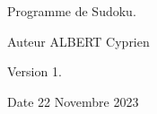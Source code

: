 Programme de Sudoku.

\begin{DoxyAuthor}{Auteur}
ALBERT Cyprien 
\end{DoxyAuthor}
\begin{DoxyVersion}{Version}
1. 
\end{DoxyVersion}
\begin{DoxyDate}{Date}
22 Novembre 2023 
\end{DoxyDate}
